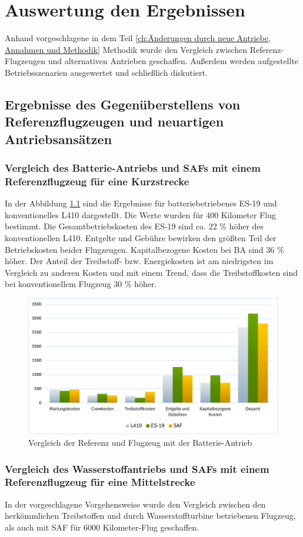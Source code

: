 \chapter{Auswertung den Ergebnissen}
\label{ch:Auswertung den Ergebnissen}
Anhand vorgeschlagene in dem Teil \ref{ch:Änderungen durch neue Antriebe, Annahmen und Methodik} Methodik wurde den Vergleich zwischen Referenz-Flugzeugen und alternativen Antrieben geschaffen.
Außerdem werden aufgestellte Betriebsszenarien ausgewertet und schließlich diskutiert.

\section{Ergebnisse des Gegenüberstellens von Referenzflugzeugen und neuartigen Antriebsansätzen}
%
\subsection{Vergleich des Batterie-Antriebs und SAFs mit einem Referenzflugzeug für eine Kurzstrecke}
%
In der Abbildung \ref{vergleichBA_Ref} sind die Ergebnisse für batteriebetriebenes ES-19 und konventionelles L410 dargestellt.
Die Werte wurden für 400 Kilometer Flug bestimmt.
Die Gesamtbetriebskosten des ES-19 sind ca. 22 \% höher des konventionellen L410. Entgelte und Gebühre bewirken den größten Teil der Betriebskosten
beider Flugzeugen. Kapitalbezogene Kosten bei BA sind 36 \% höher. Der Anteil der Treibstoff- bzw. Energiekosten ist am niedrigsten 
im Vergleich zu anderen Kosten und mit einem Trend, dass die Treibstoffkosten sind bei konventionellem Flugzeug 30 \% höher.
\begin{figure}[h]
	\centering
	\includegraphics[width=0.9\linewidth]{Bilder/VergleichBA_Ref.png}
	\caption[Betriebskosten]{Vergleich der Referenz und Flugzeug mit der Batterie-Antrieb}
	\label{vergleichBA_Ref}
\end{figure}

\subsection{Vergleich des Wasserstoffantriebs und SAFs mit einem Referenzflugzeug für eine Mittelstrecke}
In der vorgeschlagene Vorgehensweise wurde den Vergleich zwischen den herkömmlichen Treibstoffen
und durch Wasserstoffturbine betriebenen Flugzeug, als auch mit SAF für 6000 Kilometer-Flug geschaffen. %

